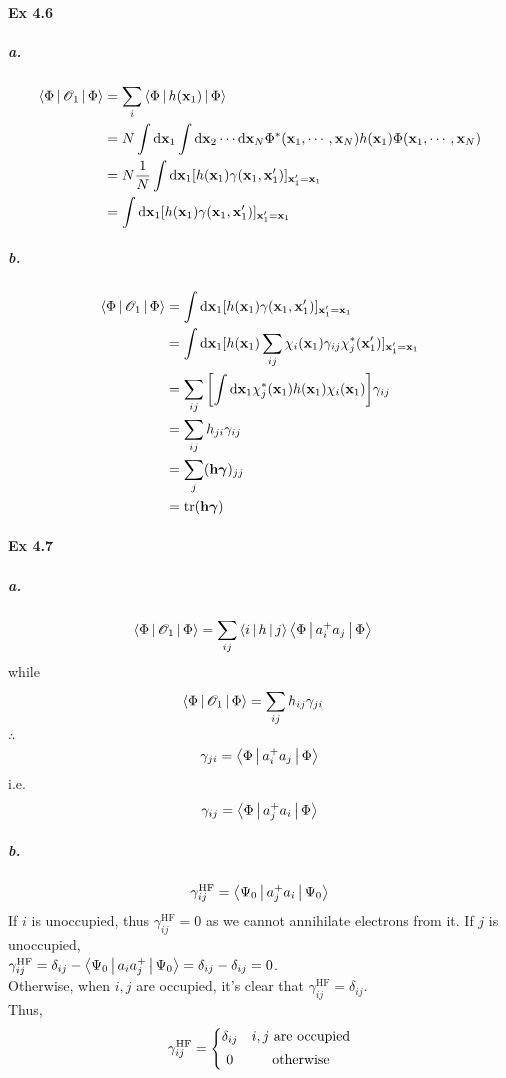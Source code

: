 \documentclass[a4paper]{article}
\newcommand{\ex}[1]{\paragraph{Ex #1}}
\newcommand{\subex}[1]{\subparagraph{#1}}
\numberwithin{equation}{subsection}
\begin{document}
\ex{4.6}
\subex{a.}
\begin{align}
\Braket{\Phi | \mathscr{O}_1 | \Phi} &= \sum_i \Braket{\Phi | h(\vb{x}_1) | \Phi} \notag\\
&= N \int\dd\vb{x}_1 \int\dd\vb{x}_2\cdots\dd\vb{x}_N \Phi^*(\vb{x}_1,\cdots,\vb{x}_N) h(\vb{x}_1) \Phi(\vb{x}_1,\cdots,\vb{x}_N) \notag\\
&= N \dfrac{1}{N}\int\dd\vb{x}_1 [h(\vb{x}_1) \gamma(\vb{x}_1,\vb{x}'_1)]_{\vb{x}'_1=\vb{x}_1} \notag\\
&= \int\dd\vb{x}_1 [h(\vb{x}_1) \gamma(\vb{x}_1,\vb{x}'_1)]_{\vb{x}'_1=\vb{x}_1}
\end{align}
\subex{b.}
\begin{align}
\Braket{\Phi | \mathscr{O}_1 | \Phi} 
&= \int\dd\vb{x}_1 [h(\vb{x}_1) \gamma(\vb{x}_1,\vb{x}'_1)]_{\vb{x}'_1=\vb{x}_1} \notag\\
&= \int\dd\vb{x}_1 [h(\vb{x}_1) \sum_{ij} \chi_i(\vb{x}_1) \gamma_{ij} \chi_j^*(\vb{x}'_1)]_{\vb{x}'_1=\vb{x}_1} \notag\\
&= \sum_{ij} \qty[\int\dd\vb{x}_1 \chi_j^*(\vb{x}_1) h(\vb{x}_1)\chi_i(\vb{x}_1)] \gamma_{ij}  \notag\\
&= \sum_{ij} h_{ji} \gamma_{ij} \notag\\
&= \sum_j (\vb{h}\bm\gamma)_{jj} \notag\\
&= \tr (\vb{h}\bm\gamma)
\end{align}

\ex{4.7}
\subex{a.}
\begin{align}
\Braket{\Phi | \mathscr{O}_1 | \Phi} 
&= \sum_{ij} \Braket{i | h | j} \Braket{\Phi | a_i^+ a_j | \Phi}
\end{align}
while
\begin{align}
\Braket{\Phi | \mathscr{O}_1 | \Phi} 
&= \sum_{ij} h_{ij} \gamma_{ji} 
\end{align}
$ \therefore $
\begin{equation}\label{key}
\gamma_{ji} = \Braket{\Phi | a_i^+ a_j | \Phi}
\end{equation}
i.e.
\begin{equation}\label{key}
\gamma_{ij} = \Braket{\Phi | a_j^+ a_i | \Phi}
\end{equation}
\subex{b.}
\begin{equation}\label{key}
\gamma_{ij}^{\text{HF}} = \Braket{\Psi_0 | a_j^+ a_i | \Psi_0} %
\end{equation}
If $ i $ is unoccupied, thus $ \gamma_{ij}^{\text{HF}} = 0 $ as we cannot annihilate electrons from it. If $ j $ is unoccupied, \\
$ \gamma_{ij}^{\text{HF}} = \delta_{ij} - \Braket{\Psi_0 | a_i a_j^+ | \Psi_0} = \delta_{ij} - \delta_{ij} = 0 $.\\
Otherwise, when $ i,j $ are occupied, it's clear that $ \gamma_{ij}^{\text{HF}} = \delta_{ij} $.\\
Thus,
\begin{equation}\label{key}
\gamma_{ij}^{\text{HF}} = \left\{
\mqty{\delta_{ij} & i,j\text{ are occupied} \vspace{5pt}\\
	  0 & \text{otherwise} }\right.
\end{equation}
\end{document}
